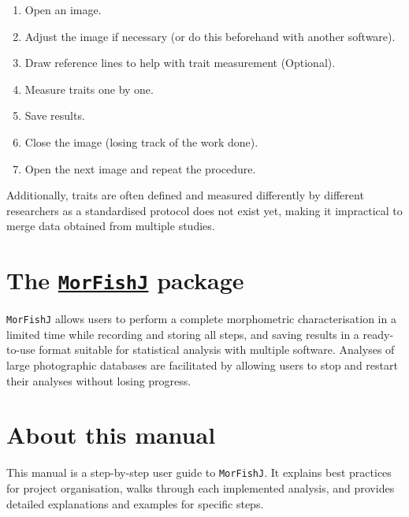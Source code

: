 \documentclass[
  letterpaper,
]{scrbook}
\providecommand{\tightlist}{%
  \setlength{\itemsep}{0pt}\setlength{\parskip}{0pt}}\usepackage{longtable,booktabs,array}
\begin{document}
\begin{enumerate}
\def\labelenumi{\arabic{enumi}.}
\tightlist
\item
  Open an image.
\item
  Adjust the image if necessary (or do this beforehand with another
  software).
\item
  Draw reference lines to help with trait measurement (Optional).
\item
  Measure traits one by one.
\item
  Save results.
\item
  Close the image (losing track of the work done).
\item
  Open the next image and repeat the procedure.
\end{enumerate}

Additionally, traits are often defined and measured differently by
different researchers as a standardised protocol does not exist yet,
making it impractical to merge data obtained from multiple studies.

\hypertarget{the-morfishj-package}{%
\section*{\texorpdfstring{The
\href{https://github.com/mattiaghilardi/MorFishJ}{\texttt{MorFishJ}}
package}{The MorFishJ package}}\label{the-morfishj-package}}

\texttt{MorFishJ} allows users to perform a complete morphometric
characterisation in a limited time while recording and storing all
steps, and saving results in a ready-to-use format suitable for
statistical analysis with multiple software. Analyses of large
photographic databases are facilitated by allowing users to stop and
restart their analyses without losing progress.

\hypertarget{about-this-manual}{%
\section*{About this manual}\label{about-this-manual}}

This manual is a step-by-step user guide to \texttt{MorFishJ}. It
explains best practices for project organisation, walks through each
implemented analysis, and provides detailed explanations and examples
for specific steps.
\end{document}
